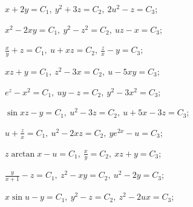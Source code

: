 \begin{enumsols}
		\label{sol:nonlinsys_systodes:symmetrical3}
		\item \( x + 2y = C_1, ~ y^2 + 3 z = C_2, ~ 2 u^2 - z = C_3 \); \sfill %
		\item \( x^2 - 2xy = C_1, ~ y^2 - z^2 = C_2, ~ uz - x = C_3 \); \sfill %
		\item \( \frac{x}{y} + z = C_1, ~ u + xz = C_2, ~ \frac{z}{x} - y = C_3 \); \sfill %
		\item \( xz + y = C_1, ~ z^2 - 3x = C_2, ~ u - 5xy = C_3 \); \sfill %
		\item \( e^z - x^2 = C_1, ~ uy - z = C_2, ~ y^2 - 3x^2 = C_3 \); \sfill %
		\item \( \sin{xz} - y = C_1, ~ u^2 - 3z = C_2, ~ u + 5x - 3z = C_3 \); \sfill %
		\item \( u + \frac{z}{x} = C_1, ~ u^2 - 2xz = C_2, ~ y e^{2x} - u = C_3 \); \sfill %
		\item \( z \arctan{x} - u = C_1, ~ \frac{x}{y} = C_2, ~ xz + y = C_3 \); \sfill %
		\item \( \frac{y}{x + 1} - z = C_1, ~ z^2 - xy = C_2, ~ u^2 - 2y = C_3 \); \sfill %
		\item \( x \sin{u} - y = C_1, ~ y^2 - z = C_2, ~ z^2 - 2ux = C_3 \); \sfill %
	
	\end{enumsols}


